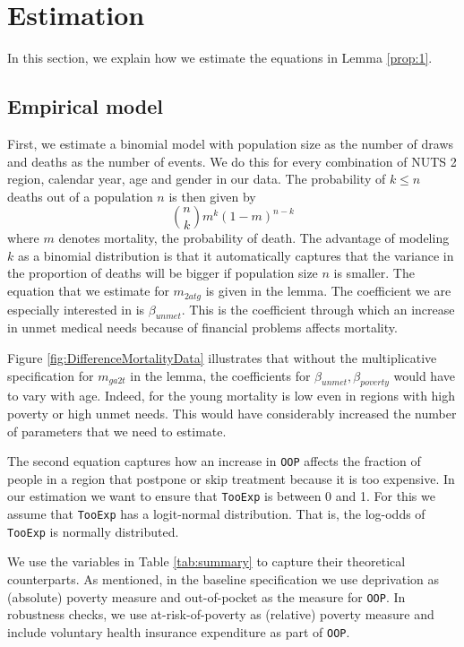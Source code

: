 \documentclass[a4paper,12pt]{article}
\begin{document}
\section{Estimation}
\label{sec:orgac95c69}
\label{sec:estimation}

In this section, we explain how we estimate the equations in Lemma \ref{prop:1}.

\subsection{Empirical model}
\label{sec:org055df58}

First, we estimate a binomial model with population size as the number of draws and deaths as the number of events. We do this for every combination of NUTS 2 region, calendar year, age and gender in our data. The probability of \(k \leq n\) deaths out of a population \(n\) is then given by
\begin{equation}
\label{eq:binomial}
\binom{n}{k} m^{k}(1-m)^{n-k}
\end{equation}
where \(m\) denotes mortality, the probability of death. The advantage of modeling \(k\) as a binomial distribution is that it automatically captures that the variance in the proportion of deaths will be bigger if population size \(n\) is smaller. The equation that we estimate for \(m_{2atg}\) is given in the lemma. The coefficient we are especially interested in is \(\beta_{unmet}\). This is the coefficient through which an increase in unmet medical needs because of financial problems affects mortality.

Figure \ref{fig:DifferenceMortalityData} illustrates that without the multiplicative specification for \(m_{ga2t}\) in the lemma, the coefficients for \(\beta_{unmet}, \beta_{poverty}\) would have to vary with age. Indeed, for the young mortality is low even in regions with high poverty or high unmet needs. This would have considerably increased the number of parameters that we need to estimate. 

The second equation captures how an increase in \texttt{OOP} affects the fraction of people in a region that postpone or skip treatment because it is too expensive. In our estimation we want to ensure that \texttt{TooExp} is between 0 and 1. For this we assume that \texttt{TooExp} has a logit-normal distribution. That is, the log-odds of \texttt{TooExp} is normally distributed.

We use the variables in Table \ref{tab:summary} to capture their theoretical counterparts. As mentioned, in the baseline specification we use deprivation as (absolute) poverty measure and out-of-pocket as the measure for \texttt{OOP}. In robustness checks, we use at-risk-of-poverty as (relative) poverty measure and include voluntary health insurance expenditure as part of \texttt{OOP}.
\end{document}
